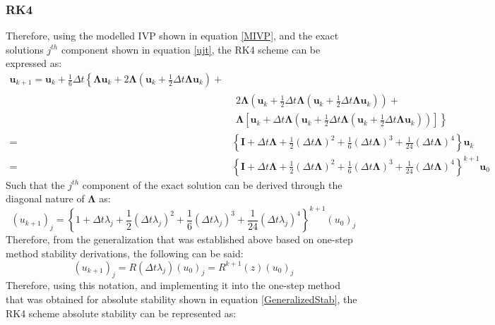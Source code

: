 \documentclass[conf]{new-aiaa}
\begin{document}
       \subsubsection{RK4}
        Therefore, using the modelled IVP shown in equation \eqref{MIVP}, and the exact solutions $j^{th}$ component shown in equation \eqref{ujt}, the RK4 scheme can be expressed as\cite{LecAS}:
     \begin{equation}
     \begin{aligned}
     \bm{u}_{k+1}=\bm{u}_{k}+\frac{1}{6} \Delta t\left\{\bm{\Lambda} \bm{u}_{k}+2 \bm{\Lambda}\left(\bm{u}_{k}+\frac{1}{2} \Delta t \bm{\Lambda} \bm{u}_{k}\right)+\right.\\
     & \begin{aligned}
     2 \bm{\Lambda}\left(\bm{u}_{k}+\frac{1}{2} \Delta t \bm{\Lambda}\left(\bm{u}_{k}+\frac{1}{2} \Delta t \bm{\Lambda} \bm{u}_{k}\right)\right)+\\
     \left.\bm{\Lambda}\left[\bm{u}_{k}+\Delta t \bm{\Lambda}\left(\bm{u}_{k}+\frac{1}{2} \Delta t \bm{\Lambda}\left(\bm{u}_{k}+\frac{1}{2} \Delta t \bm{\Lambda} \bm{u}_{k}\right)\right)\right]\right\}
     \end{aligned} \\
     =&\left\{\bm{I}+\Delta t \bm{\Lambda}+\frac{1}{2}(\Delta t \bm{\Lambda})^{2}+\frac{1}{6}(\Delta t \bm{\Lambda})^{3}+\frac{1}{24}(\Delta t \bm{\Lambda})^{4}\right\} \bm{u}_{k} \\
     =&\left\{\bm{I}+\Delta t \bm{\Lambda}+\frac{1}{2}(\Delta t \bm{\Lambda})^{2}+\frac{1}{6}(\Delta t \bm{\Lambda})^{3}+\frac{1}{24}(\Delta t \bm{\Lambda})^{4}\right\}^{k+1} \bm{u}_{0}
     \end{aligned}
     \end{equation}
     Such that the $j^{th}$ component of the exact solution can be derived through the diagonal nature of $\bm{\Lambda}$ as:
     \begin{equation}
         (u_{k+1})_j = \left\{1 + \Delta t \lambda_j + \frac{1}{2}(\Delta t \lambda_j)^2 + \frac{1}{6}(\Delta t \lambda_j)^3 + \frac{1}{24}(\Delta t \lambda_j)^4 \right\}^{k+1}(u_0)_j
     \end{equation}
     Therefore, from the generalization that was established above based on one-step method stability derivations, the following can be said\cite{NumStab}:
     \begin{equation*}
         (u_{k+1})_j = R(\Delta t \lambda_j)(u_0)_j = R^{k+1}(z)(u_0)_j
     \end{equation*}
     Therefore, using this notation, and implementing it into the one-step method that was obtained for absolute stability shown in equation \eqref{GeneralizedStab},  the RK4 scheme absolute stability can be represented as:
\end{document}
